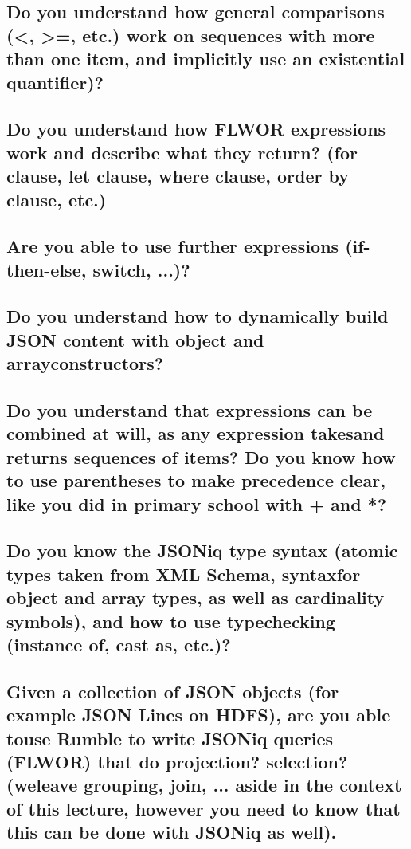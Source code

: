 \documentclass{article}
\begin{document}
\subsection{Do you understand how general comparisons (<, >=, etc.) work on sequences with more than one item, and implicitly use an existential quantifier)?}
\subsection{Do you understand how FLWOR expressions work and describe what they return? (for clause, let clause, where clause, order by clause, etc.)}
\subsection{Are you able to use further expressions (if-then-else, switch, ...)?}
\subsection{Do you understand how to dynamically build JSON content with object and arrayconstructors?}
\subsection{Do you understand that expressions can be combined at will, as any expression takesand returns sequences of items? Do you know how to use parentheses to make precedence clear, like you did in primary school with + and *?}
\subsection{Do you know the JSONiq type syntax (atomic types taken from XML Schema, syntaxfor object and array types, as well as cardinality symbols), and how to use typechecking (instance of, cast as, etc.)?}
\subsection{Given a collection of JSON objects (for example JSON Lines on HDFS), are you able touse Rumble to write JSONiq queries (FLWOR) that do projection? selection? (weleave grouping, join, ... aside in the context of this lecture, however you need to know that this can be done with JSONiq as well).}

\end{document}
